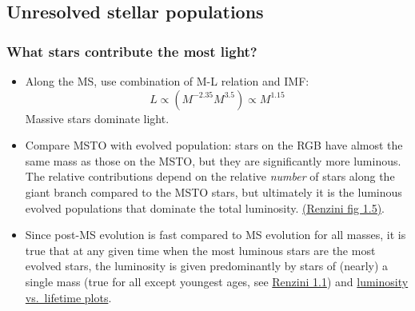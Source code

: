 \documentclass{article}
\begin{document}
\subsection{Unresolved stellar populations}
\subsubsection{What stars contribute the most light?}
\begin{itemize}
    \item Along the MS, use combination of M-L relation and IMF:
        \[
            L \propto \left(M^{-2.35}M^{3.5}\right) \propto M^{1.15}
            \]
        Massive stars dominate light.
    \item Compare MSTO with evolved population: stars on the RGB have almost
        the same mass as those on the MSTO, but they are significantly more
        luminous.  The relative contributions depend on the relative
        \emph{number} of stars along the giant branch compared to the MSTO
        stars, but ultimately it is the luminous evolved populations that
        dominate the total luminosity.
        \href{http://astronomy.nmsu.edu/holtz/a555/images/renzini5.htm}
        {(Renzini fig 1.5)}.
    \item Since post-MS evolution is fast compared to MS evolution for all
        masses, it is true that at any given time when the most luminous stars
        are the most evolved stars, the luminosity is given predominantly by
        stars of (nearly) a single mass (true for all except youngest ages, see
        \href{http://astronomy.nmsu.edu/holtz/a555/images/renzini1.htm}
        {Renzini 1.1}) and
        \href{http://astronomy.nmsu.edu/holtz/a555/resources/iso.html}
        {luminosity vs.\ lifetime plots}.
\end{itemize}
\end{document}
